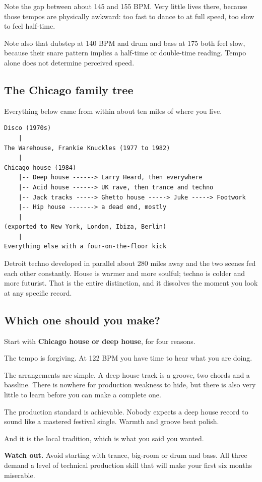 Note the gap between about 145 and 155 BPM. Very little lives there, because those tempos
are physically awkward: too fast to dance to at full speed, too slow to feel half-time.

Note also that dubstep at 140 BPM and drum and bass at 175 both feel slow, because their
snare pattern implies a half-time or double-time reading. Tempo alone does not determine
perceived speed.

\subsection{The Chicago family tree}\label{th08_genre_map-the-chicago-family-tree}

Everything below came from within about ten miles of where you live.

\begin{verbatim}
Disco (1970s)
    |
The Warehouse, Frankie Knuckles (1977 to 1982)
    |
Chicago house (1984)
    |-- Deep house ------> Larry Heard, then everywhere
    |-- Acid house ------> UK rave, then trance and techno
    |-- Jack tracks -----> Ghetto house -----> Juke -----> Footwork
    |-- Hip house -------> a dead end, mostly
    |
(exported to New York, London, Ibiza, Berlin)
    |
Everything else with a four-on-the-floor kick
\end{verbatim}

Detroit techno developed in parallel about 280 miles away and the two scenes fed each other
constantly. House is warmer and more soulful; techno is colder and more futurist. That is
the entire distinction, and it dissolves the moment you look at any specific record.

\subsection{Which one should you make?}\label{th08_genre_map-which-one-should-you-make}

Start with \textbf{Chicago house or deep house}, for four reasons.

The tempo is forgiving. At 122 BPM you have time to hear what you are doing.

The arrangements are simple. A deep house track is a groove, two chords and a bassline.
There is nowhere for production weakness to hide, but there is also very little to learn
before you can make a complete one.

The production standard is achievable. Nobody expects a deep house record to sound like a
mastered festival single. Warmth and groove beat polish.

And it is the local tradition, which is what you said you wanted.

\begin{pitfallbox}
\textbf{Watch out.} Avoid starting with trance, big-room or drum and bass. All three demand a
level of technical production skill that will make your first six months miserable.
\end{pitfallbox}
